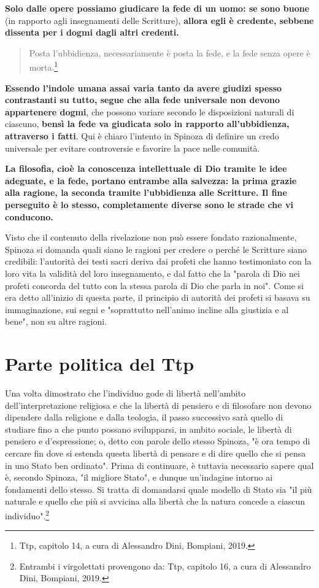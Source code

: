 \textbf{Solo dalle opere possiamo giudicare la fede di un uomo: se sono buone} (in rapporto agli insegnamenti delle Scritture), \textbf{allora egli è credente, sebbene dissenta per i dogmi dagli altri credenti.}

\begin{quotation}
	\small Posta l'ubbidienza, necessariamente è posta la fede, e la fede senza opere è morta.\footnote{Ttp, capitolo 14, a cura di Alessandro Dini, Bompiani, 2019.}
\end{quotation}

\textbf{Essendo l'indole umana assai varia tanto da avere giudizi spesso contrastanti su tutto, segue che alla fede universale non devono appartenere dogmi}, che possono variare secondo le disposizioni naturali di ciascuno, \textbf{bensì la fede va giudicata solo in rapporto all'ubbidienza, attraverso i fatti}. Qui è chiaro l'intento in Spinoza di definire un credo universale per evitare controversie e favorire la pace nelle comunità.

\textbf{La filosofia, cioè la conoscenza intellettuale di Dio tramite le idee adeguate, e la fede, portano entrambe alla salvezza: la prima grazie alla ragione, la seconda tramite l'ubbidienza alle Scritture. Il fine perseguito è lo stesso, completamente diverse sono le strade che vi conducono.}

Visto che il contenuto della rivelazione non può essere fondato razionalmente, Spinoza si domanda quali siano le ragioni per credere  o perché le Scritture siano credibili: l'autorità dei testi sacri deriva dai profeti che hanno testimoniato con la loro vita la validità del loro insegnamento, e dal fatto che la "parola di Dio nei profeti concorda del tutto con la stessa parola di Dio che parla in noi".
Come si era detto all'inizio di questa parte, il principio di autorità dei profeti si basava su immaginazione, sui segni e "soprattutto nell'animo incline alla giustizia e al bene", non su altre ragioni.

\section[Parte politica]{Parte politica del Ttp}

Una volta dimostrato che l’individuo gode di libertà nell’ambito dell’interpretazione religiosa e che la libertà di pensiero e 
di filosofare non devono dipendere dalla religione e dalla teologia, il passo successivo sarà quello di studiare fino a che punto possano svilupparsi, in ambito
sociale, le libertà di pensiero e d’espressione; o, detto con parole dello stesso
Spinoza, "è ora tempo di cercare fin dove si estenda questa libertà di pensare
e di dire quello che si pensa in uno Stato ben ordinato". Prima di continuare, è tuttavia necessario sapere qual è, secondo Spinoza, "il migliore Stato", e
dunque un’indagine intorno ai fondamenti dello stesso. Si tratta di domandarsi
quale modello di Stato sia "il più naturale e quello che più si avvicina alla libertà che la natura concede a ciascun individuo".\footnote{Entrambi i virgolettati provengono da: Ttp, capitolo 16, a cura di Alessandro Dini, Bompiani, 2019.}

